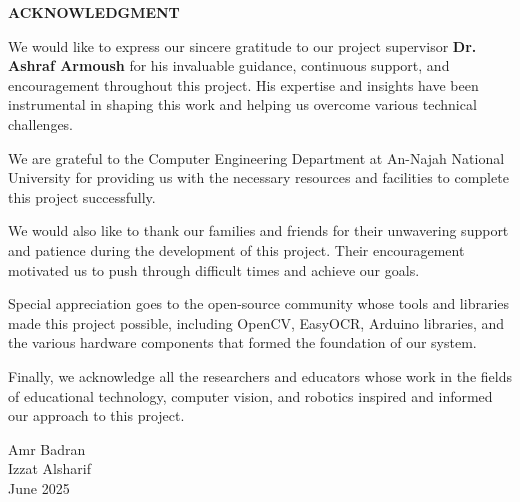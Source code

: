 \begin{center}
\Large \textbf{ACKNOWLEDGMENT}
\end{center}

\vspace{1cm}

We would like to express our sincere gratitude to our project supervisor \textbf{Dr. Ashraf Armoush} for his invaluable guidance, continuous support, and encouragement throughout this project. His expertise and insights have been instrumental in shaping this work and helping us overcome various technical challenges.

We are grateful to the Computer Engineering Department at An-Najah National University for providing us with the necessary resources and facilities to complete this project successfully.

We would also like to thank our families and friends for their unwavering support and patience during the development of this project. Their encouragement motivated us to push through difficult times and achieve our goals.

Special appreciation goes to the open-source community whose tools and libraries made this project possible, including OpenCV, EasyOCR, Arduino libraries, and the various hardware components that formed the foundation of our system.

Finally, we acknowledge all the researchers and educators whose work in the fields of educational technology, computer vision, and robotics inspired and informed our approach to this project.

\vspace{2cm}

\begin{flushright}
Amr Badran \\
Izzat Alsharif \\
June 2025
\end{flushright}